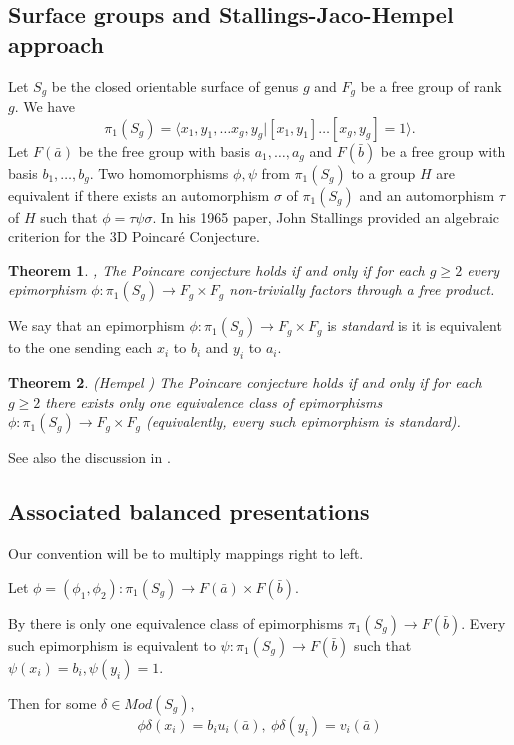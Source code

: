 \documentclass{article}
\newtheorem{theorem}{Theorem}[section]
\begin{document}
\subsection{Surface groups and Stallings-Jaco-Hempel approach} Let $S_g$ be the closed orientable surface of genus $g$ and $F_g$ be a free group of rank $g$. We have $$\pi _1(S_g)=\langle x_1,y_1,\ldots x_g,y_g| [x_1,y_1]\ldots [x_g,y_g]=1\rangle .$$  Let $F(\bar a)$ be the free group with basis $a_1,\ldots ,a_g$ and $F(\bar b)$ be a free group with basis $b_1,\ldots ,b_g$. Two homomorphisms $\phi ,\psi$ from $\pi _1(S_g)$ to a group $H$ are equivalent if
there exists an automorphism $\sigma$ of $\pi _1(S_g)$  and an automorphism $\tau$ of $H$
such that $\phi =\tau\psi\sigma.$ In his 1965 paper, John Stallings provided an algebraic criterion for the 3D Poincar\'{e} Conjecture.
\begin{theorem} \cite{J},\cite{S} The Poincare conjecture holds if and only if for each $g\geq 2$ every  epimorphism $\phi: \pi _1(S_g)\rightarrow F_g\times F_g$ non-trivially factors through a free product.
\end{theorem} 

We say that an epimorphism $\phi: \pi _1(S_g)\rightarrow F_g\times F_g$ is {\em standard} is it is equivalent to the one sending each $x_i$ to $b_i$ and $y_i$ to $a_i$. 
\begin{theorem} (Hempel \cite{H}) The Poincare conjecture holds if and only if for each $g\geq 2$ there exists only one equivalence class of epimorphisms $\phi: \pi _1(S_g)\rightarrow F_g\times F_g$ (equivalently, every such epimorphism is standard).
\end{theorem}
See also the discussion in  \cite{GK2}.

\subsection{Associated balanced presentations}


Our convention will be to multiply mappings right to left.
 
Let $\phi =(\phi_1, \phi _2): \pi _1(S_g)\rightarrow F(\bar a)\times F(\bar b).$

By  \cite[Theorem 1]{GK1}  there is only one equivalence class  of epimorphisms $\pi _1(S_g)\rightarrow F(\bar b)$.  Every such epimorphism is equivalent to 
$\psi: \pi _1(S_g)\rightarrow F(\bar b)$ such that
$\psi (x_i)=b_i, \psi (y_i)=1.$



Then for some $\delta\in Mod(S_g)$, $$\phi\delta (x_i)=b_iu_i(\bar a),\ \phi\delta (y_i)=v_i(\bar a)$$
\end{document}
